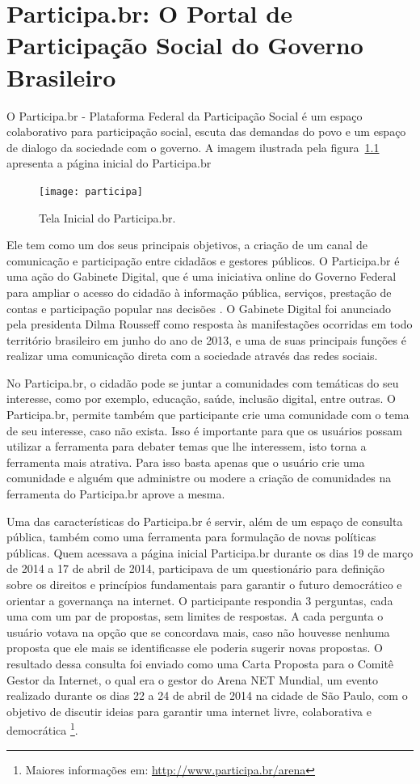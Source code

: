  \chapter{Participa.br: O Portal de Participação Social do Governo Brasileiro}
\label{cap:participabr}

O Participa.br - Plataforma Federal da Participação Social é um espaço colaborativo  para participação social, escuta das demandas do povo e um espaço de dialogo da sociedade com o governo. A imagem ilustrada pela figura~\ref{fig:participabr} apresenta a página inicial do Participa.br

\graphicspath{{figuras/}}
\begin{figure}[H]
\centering
\texttt{[image: participa]}
\caption{Tela Inicial do Participa.br.}
\label{fig:participabr}
\end{figure}

Ele tem como um dos seus principais objetivos, a criação de um canal de comunicação e participação entre cidadãos e gestores públicos. O Participa.br é uma ação do Gabinete Digital, que é uma iniciativa online do Governo Federal para ampliar o acesso do cidadão à informação pública, serviços, prestação de contas e participação popular nas decisões \cite{gabinete2013brasil}. O Gabinete Digital foi anunciado pela presidenta Dilma Rousseff como resposta às manifestações ocorridas em todo território brasileiro em junho do ano de 2013, e uma de suas principais funções é realizar uma comunicação direta com a sociedade através das redes sociais.

No Participa.br, o cidadão pode se juntar a comunidades com temáticas do seu interesse, como por exemplo, educação, saúde, inclusão digital, entre outras. O Participa.br, permite também que participante crie uma comunidade com o tema de seu interesse, caso não exista. Isso é importante para que os usuários possam utilizar a ferramenta para debater temas que lhe interessem, isto torna a ferramenta mais atrativa. Para isso basta apenas que o usuário crie uma comunidade e alguém que administre ou modere a criação de comunidades na ferramenta do Participa.br aprove a mesma.

Uma das características do Participa.br é servir, além de um espaço de consulta pública, também como uma ferramenta para formulação de novas políticas públicas. Quem acessava a página inicial Participa.br durante os dias 19 de março de 2014 a 17 de abril de 2014, participava de um questionário para definição sobre os direitos e princípios fundamentais para garantir o futuro democrático e orientar a governança na internet. O participante respondia 3 perguntas, cada uma com um par de propostas, sem limites de respostas. A cada pergunta o usuário votava na opção que se concordava mais, caso não houvesse nenhuma proposta que ele mais se identificasse ele poderia sugerir novas propostas. O resultado dessa consulta foi enviado como uma Carta Proposta para o Comitê Gestor da Internet, o qual era o gestor do Arena NET Mundial, um evento realizado durante os dias 22 a 24 de abril de 2014 na cidade de São Paulo, com o objetivo de discutir ideias para garantir uma internet livre, colaborativa e democrática \footnote{Maiores informações em: \url{http://www.participa.br/arena}}.

